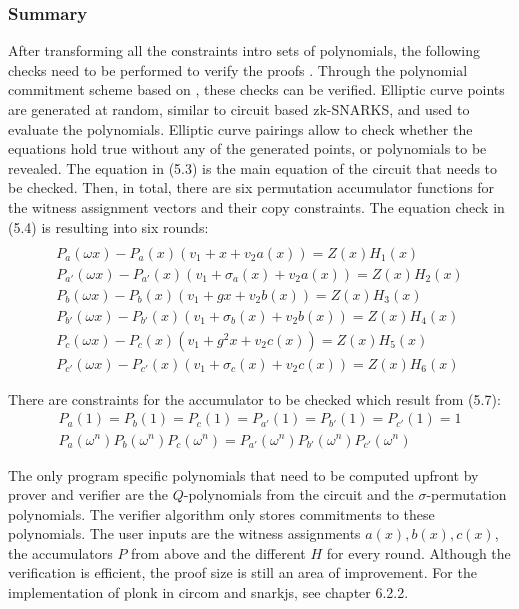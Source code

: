 \subsubsection{Summary}
After transforming all the constraints intro sets of polynomials, the following checks need to be performed to verify the proofs \citep{PLONKcryptoeprint:2019/953, buterinplonk, chen2022review}. Through the polynomial commitment scheme based on \citep{Kate2010ConstantSizeCT}, these checks can be verified. Elliptic curve points are generated at random, similar to circuit based zk-SNARKS, and used to evaluate the polynomials. Elliptic curve pairings allow to check whether the equations hold true without any of the generated points, or polynomials to be revealed. 
The equation in (5.3) is the main equation of the circuit that needs to be checked. Then, in total, there are six permutation accumulator functions for the witness assignment vectors and their copy constraints. The equation check in (5.4) is resulting into six rounds:
\begin{align}
\end{align}
\begin{align*}
    P_{a}(\omega x) - P_{a}(x)(v_1 + x + v_2a(x)) = Z(x)H_{1}(x) \\
    P_{a'}(\omega x) - P_{a'}(x)(v_1 + \sigma_{a}(x) + v_2a(x)) = Z(x)H_{2}(x) \\
    P_{b}(\omega x) - P_{b}(x)(v_1 + gx + v_2b(x)) = Z(x)H_{3}(x) \\
    P_{b'}(\omega x) - P_{b'}(x)(v_1 + \sigma_{b}(x) + v_2b(x)) = Z(x)H_{4}(x) \\
    P_{c}(\omega x) - P_{c}(x)(v_1 + g^{2}x + v_2c(x)) = Z(x)H_{5}(x) \\
    P_{c'}(\omega x) - P_{c'}(x)(v_1 + \sigma_{c}(x) + v_2c(x)) = Z(x)H_{6}(x)
\end{align*}

There are constraints for the accumulator to be checked which result from (5.7):
\begin{align}
    P_{a}(1) = P_{b}(1) = P_{c}(1) = P_{a'}(1) = P_{b'}(1) = P_{c'}(1) = 1 \\
    P_{a}(\omega^n)P_{b}(\omega^n)P_{c}(\omega^n) = P_{a'}(\omega^n)P_{b'}(\omega^n)P_{c'}(\omega^n)
\end{align}

The only program specific polynomials that need to be computed upfront by prover and verifier are the \(Q\)-polynomials from the circuit and the \(\sigma\)-permutation polynomials. The verifier algorithm only stores commitments to these polynomials. The user inputs are the witness assignments \(a(x), b(x), c(x)\), the accumulators \(P\) from above and the different \(H\) for every round. Although the verification is efficient, the proof size is still an area of improvement. For the implementation of plonk in circom and snarkjs, see chapter 6.2.2.

